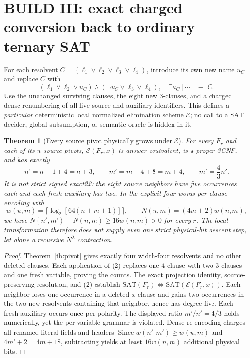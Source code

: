 \documentclass[10pt]{article}
\newtheorem{theorem}{Theorem}
\newcommand{\SAT}{\mathrm{SAT}}
\begin{document}
\section{BUILD III: exact charged conversion back to ordinary ternary SAT}
For each resolvent $C=(\ell_1\vee\ell_2\vee\ell_3\vee\ell_4)$, introduce its own new name $u_C$ and replace $C$ with
\[
(\ell_1\vee\ell_2\vee u_C)\land(\neg u_C\vee\ell_3\vee\ell_4),
\quad \exists u_C[\cdots]\;\equiv\; C.\tag{2}
\]
Use the unchanged surviving clauses, the eight new 3-clauses, and a charged dense renumbering of all live source and auxiliary identifiers. This defines a \emph{particular} deterministic local normalized elimination scheme $\mathcal E$; no call to a SAT decider, global subsumption, or semantic oracle is hidden in it.
\begin{theorem}[Every source pivot physically grows under $\mathcal E$]\label{th:growth}
For every $F_r$ and each of its $n$ source pivots, $\mathcal E(F_r,x)$ is answer-equivalent, is a proper 3CNF, and has exactly
\[
 n'=n-1+4=n+3,\qquad m'=m-4+8=m+4,\qquad m'=\frac43n'.
\]
It is \emph{not} strict signed exact22: the eight source neighbors have five occurrences each and each fresh auxiliary has two. In the explicit four-words-per-clause encoding with
\[
w(n,m)=\big\lceil\log_2[64(n+m+1)]\big\rceil,\qquad N(n,m)=(4m+2)w(n,m),
\]
we have $N(n',m')-N(n,m)\ge16w(n,m)>0$ for every $r$. The local transformation therefore does \emph{not} supply even one strict physical-bit descent step, let alone a recursive $N^\lambda$ contraction.
\end{theorem}
\begin{proof}
Theorem~\ref{th:pivot} gives exactly four width-four resolvents and no other deleted clauses. Each application of (2) replaces one 4-clause with two 3-clauses and one fresh variable, proving the counts. The exact projection identity, source-preserving resolution, and (2) establish $\SAT(F_r)\Leftrightarrow\SAT(\mathcal E(F_r,x))$. Each neighbor loses one occurrence in a deleted $x$-clause and gains two occurrences in the two new resolvents containing that neighbor, hence has degree five. Each fresh auxiliary occurs once per polarity. The displayed ratio $m'/n'=4/3$ holds numerically, yet the per-variable grammar is violated. Dense re-encoding charges all renamed literal fields and headers. Since $w(n',m')\ge w(n,m)$ and $4m'+2=4m+18$, subtracting yields at least $16w(n,m)$ additional physical bits.
\end{proof}
\end{document}
